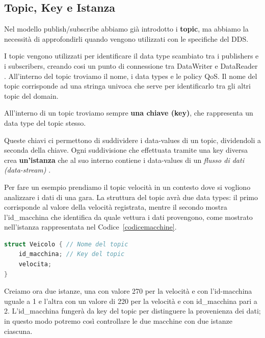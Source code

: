 
\subsection{Topic, Key e Istanza}
Nel modello publish/subscribe abbiamo già introdotto i \textbf{topic}, ma 
abbiamo la necessità di approfondirli quando vengono utilizzati
con le specifiche del DDS.

I topic vengono utilizzati per identificare il data type
scambiato tra i publishers e i subscribers, creando cosi un punto
di connessione 
tra DataWriter e DataReader \cite{topicomg}.
All'interno del topic troviamo il nome,
i data types e le policy QoS.
Il nome del topic corrisponde ad una stringa univoca 
che serve per identificarlo 
tra gli altri topic del domain.

All'interno di un topic troviamo sempre 
\textbf{una chiave (key)}, che rappresenta 
un data type del topic stesso.

Queste chiavi ci permettono di suddividere
i data-values di un topic, dividendoli a seconda della chiave.
Ogni suddivisione che effettuata tramite una key diversa crea 
\textbf{un'istanza} che al suo interno contiene i data-values di un 
\textit{flusso di dati (data-stream)}
\cite{Instance81:online}.

Per fare un esempio prendiamo il topic velocità in un contesto dove si
vogliono analizzare i dati di una gara.
La struttura del topic avrà due data types: il primo corrisponde al valore
della velocità registrata, mentre il secondo mostra l'id\_macchina 
che identifica da quale vettura i dati provengono, come mostrato 
nell'istanza rappresentata nel
Codice~\ref{codicemacchine}.

\vspace{5mm} %
\begin{lstlisting}[language=C++, caption=Esempio di Topic con una key
    usando il linguaggio IDL.
    , label=topic struct,
    captionpos=b]
struct Veicolo { // Nome del topic
    id_macchina; // Key del topic
    velocita;
}
\end{lstlisting}
\label{codicemacchine}
\vspace{5mm}

Creiamo ora due istanze, una con valore 270 per la velocità e con 
l'id-macchina uguale a 1 e l'altra con un valore di 220 per la velocità e 
con id\_macchina 
pari a 2. L'id\_macchina fungerà da key 
del topic per distinguere la provenienza dei dati; in questo
modo potremo così controllare le due macchine con due istanze ciascuna.
\
\label{Key e Istanza}

